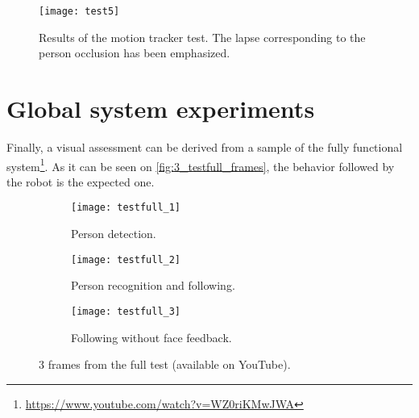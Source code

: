 \begin{figure}[h]
	\centering
	\texttt{[image: test5]}
	\caption{Results of the motion tracker test. The lapse corresponding to the person occlusion has been emphasized.}
	\label{fig:3_test5}
\end{figure}



\section{Global system experiments}

Finally, a visual assessment can be derived from a sample of the fully functional system\footnote{\url{https://www.youtube.com/watch?v=WZ0riKMwJWA}}. As it can be seen on \autoref{fig:3_testfull_frames}, the behavior followed by the robot is the expected one.

\begin{figure}[h]
	\centering
	\begin{subfigure}[t]{0.3\linewidth}
		\centering
		\texttt{[image: testfull\_1]}
		\caption{Person detection.}
	\end{subfigure}
	\begin{subfigure}[t]{0.3\linewidth}
		\centering
		\texttt{[image: testfull\_2]}
		\caption{Person recognition and following.}
	\end{subfigure}
	\begin{subfigure}[t]{0.3\linewidth}
		\centering
		\texttt{[image: testfull\_3]}
		\caption{Following without face feedback.}
	\end{subfigure}
	\caption{3 frames from the full test (available on YouTube).}
	\label{fig:3_testfull_frames}
\end{figure}



